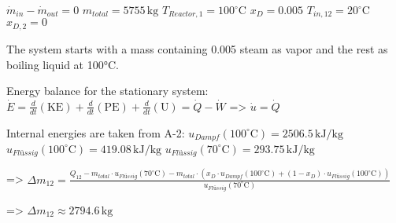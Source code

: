 \( \dot{m}_{in} - \dot{m}_{out} = 0 \)  
\( m_{total} = 5755 \, \text{kg} \)  
\( T_{Reactor,1} = 100^\circ \text{C} \)  
\( x_D = 0.005 \)  
\( T_{in,12} = 20^\circ \text{C} \)  
\( x_{D,2} = 0 \)  

The system starts with a mass containing 0.005 steam as vapor and the rest as boiling liquid at 100°C.  

Energy balance for the stationary system:  
\( \dot{E} = \frac{d}{dt} (\text{KE}) + \frac{d}{dt} (\text{PE}) + \frac{d}{dt} (\text{U}) = \dot{Q} - \dot{W} \)  
=> \( \dot{u} = \dot{Q} \)  

Internal energies are taken from A-2:  
\( u_{Dampf}(100^\circ \text{C}) = 2506.5 \, \text{kJ/kg} \)  
\( u_{Flüssig}(100^\circ \text{C}) = 419.08 \, \text{kJ/kg} \)  
\( u_{Flüssig}(70^\circ \text{C}) = 293.75 \, \text{kJ/kg} \)  

=>  
\( \Delta m_{12} = \frac{Q_{12} - m_{total} \cdot u_{Flüssig}(70^\circ \text{C}) - m_{total} \cdot (x_D \cdot u_{Dampf}(100^\circ \text{C}) + (1 - x_D) \cdot u_{Flüssig}(100^\circ \text{C}))}{u_{Flüssig}(70^\circ \text{C})} \)  

=>  
\( \Delta m_{12} \approx 2794.6 \, \text{kg} \)